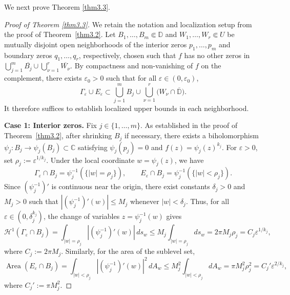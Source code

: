 \documentclass[12pt,twoside]{amsart}
\numberwithin{equation}{section}
\numberwithin{definition}{section} %
\begin{document}
We next prove Theorem \ref{thm3.3}.

\begin{proof}[Proof of Theorem \ref{thm3.3}]
We retain the notation and localization setup from the proof of Theorem~\ref{thm3.2}. Let $B_1, \dots, B_m \Subset \mathbb{D}$ and $W_1, \dots, W_r \Subset U$ be mutually disjoint open neighborhoods of the interior zeros $p_1, \dots, p_m$ and boundary zeros $q_1, \dots, q_r$, respectively, chosen such that $f$ has no other zeros in $\bigcup_{j=1}^m \overline{B_j} \cup \bigcup_{\nu=1}^r \overline{W_\nu}$. By compactness and non-vanishing of $f$ on the complement, there exists $\varepsilon_0 > 0$ such that for all $\varepsilon \in (0, \varepsilon_0)$,
\[
\Gamma_\varepsilon \cup E_\varepsilon \subset \bigcup_{j=1}^m B_j \cup \bigcup_{\nu=1}^r \bigl(W_\nu \cap \overline{\mathbb{D}}\bigr).
\]
It therefore suffices to establish localized upper bounds in each neighborhood.

\medskip
\noindent\textbf{Case 1: Interior zeros.} 
Fix $j \in \{1, \dots, m\}$. As established in the proof of Theorem~\ref{thm3.2}, after shrinking $B_j$ if necessary, there exists a biholomorphism $\psi_j \colon B_j \to \psi_j(B_j) \subset \mathbb{C}$ satisfying $\psi_j(p_j) = 0$ and $f(z) = \psi_j(z)^{k_j}$. For $\varepsilon > 0$, set $\rho_j := \varepsilon^{1/k_j}$. Under the local coordinate $w = \psi_j(z)$, we have
\[
\Gamma_\varepsilon \cap B_j = \psi_j^{-1}(\{|w| = \rho_j\}), \qquad E_\varepsilon \cap B_j = \psi_j^{-1}(\{|w| < \rho_j\}).
\]
Since $(\psi_j^{-1})'$ is continuous near the origin, there exist constants $\delta_j > 0$ and $M_j > 0$ such that $|(\psi_j^{-1})'(w)| \le M_j$ whenever $|w| < \delta_j$. Thus, for all $\varepsilon \in (0, \delta_j^{k_j})$, the change of variables $z = \psi_j^{-1}(w)$ gives
\[
\mathcal{H}^1(\Gamma_\varepsilon \cap B_j) = \int_{|w|=\rho_j} |(\psi_j^{-1})'(w)|\,ds_w \le M_j \int_{|w|=\rho_j} ds_w = 2\pi M_j \rho_j = C_j \varepsilon^{1/k_j},
\]
where $C_j := 2\pi M_j$. Similarly, for the area of the sublevel set,
\[
\operatorname{Area}(E_\varepsilon \cap B_j) = \int_{|w|<\rho_j} |(\psi_j^{-1})'(w)|^2\,dA_w \le M_j^2 \int_{|w|<\rho_j} dA_w = \pi M_j^2 \rho_j^2 = C_j' \varepsilon^{2/k_j},
\]
where $C_j' := \pi M_j^2$.


\end{proof}
\end{document}
